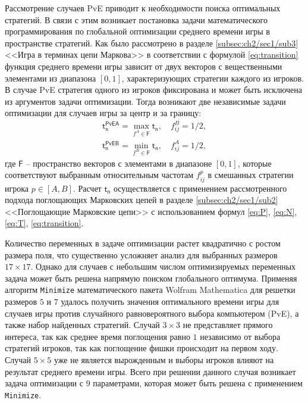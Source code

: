 Рассмотрение случаев PvE приводит к необходимости поиска оптимальных стратегий. В связи с этим возникает постановка задачи 
математического программирования по глобальной оптимизации среднего времени игры в пространстве стратегий. 
Как было рассмотрено в разделе \cref{subsec:ch2/sec1/sub3} <<Игра в терминах цепи Маркова>> в соответствии с формулой \eqref{eq:transition} функция среднего времени игры
зависит от двух векторов с вещественными элементами из диапазона $[0, 1]$, характеризующих стратегии каждого из игроков.
В случае PvE стратегия одного из игроков фиксирована и может быть исключена из аргументов задачи оптимизации.
Тогда возникают две независимые задачи оптимизации для случаев игры за центр и за границу:
\begin{equation}
    \begin{aligned}
        \boldsymbol{\mathsf{t_n^{PvEA}}} = \max_{f^A \in \boldsymbol{\mathsf{F}}} \boldsymbol{\mathsf{t_n}}, \hspace{1em} f_{ij}^B=1/2,
    \label{eq:centeropt}
    \end{aligned}
\end{equation}
\begin{equation}
    \begin{aligned}
        \boldsymbol{\mathsf{t_n^{PvEB}}} = \min_{f^B \in \boldsymbol{\mathsf{F}}} \boldsymbol{\mathsf{t_n}}, \hspace{1em}  f_{ij}^A=1/2,
    \label{eq:borderopt}
    \end{aligned}
\end{equation}
где $\boldsymbol{\mathsf{F}}$ -- пространство векторов с элементами в диапазоне $[0, 1]$, которые соответствуют выбранным относительным частотам $f_{ij}^p$
в смешанных стратегии игрока $p \in [A, B]$. Расчет $\boldsymbol{\mathsf{t_n}}$ осуществляется с применением рассмотренного подхода поглощающих Марковских цепей
в разделе \cref{subsec:ch2/sec1/sub2} <<Поглощающие Марковские цепи>> с использованием формул \eqref{eq:P}, \eqref{eq:N}, \eqref{eq:T}, \eqref{eq:transition}.

Количество переменных в задаче оптимизации растет квадратично с ростом размера поля, что существенно усложняет анализ для выбранных размеров $17 \times 17$.
Однако для случаев с небольшим числом оптимизируемых переменных задача может быть решена напрямую поиском глобального оптимума.
Применяя алгоритм \texttt{Minimize} математического пакета Wolfram Mathematica для решетки размеров $5$ и $7$ удалось получить значения
оптимального времени игры для случаев игры против случайного равновероятного выбора компьютером (PvE), а также набор найденных стратегий.
Случай $3 \times 3$ не представляет прямого интереса, так как среднее время поглощения равно $1$ независимо от выбора стратегий игроков, 
так как поглощение фишки происходит на первом ходу. Случай $5 \times 5$ уже не является вырожденным и выборы игроков влияют на результат среднего времени игры.
Всего при решении данного случая возникает задача оптимизации с $9$ параметрами, которая может быть решена с применением \texttt{Minimize}.

